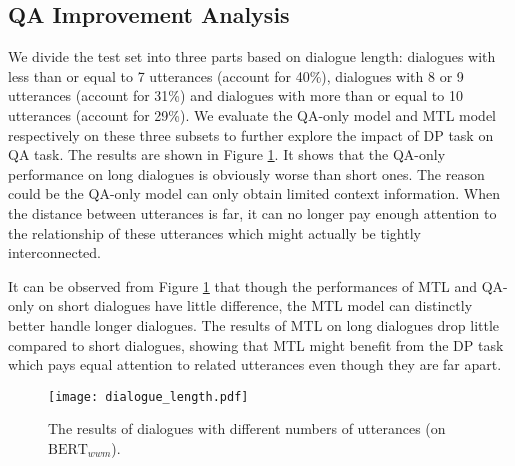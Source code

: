 \documentclass[11pt]{article}
\begin{document}
\subsection{QA Improvement Analysis}\label{subsec:QA improvement analysis}
We divide the test set into three parts based on dialogue length: dialogues with less than or equal to 7 utterances (account for 40\%), dialogues with 8 or 9 utterances (account for 31\%) and dialogues with more than or equal to 10 utterances (account for 29\%). We evaluate the QA-only model and MTL model respectively on these three subsets to further explore the impact of DP task on QA task. The results are shown in Figure \ref{fig:dialogue length}. It shows that the QA-only performance on long dialogues is obviously worse than short ones. The reason could be the QA-only model can only obtain limited context information. When the distance between utterances is far, it can no longer pay enough attention to the relationship of these utterances which might actually be tightly interconnected.

It can be observed from Figure \ref{fig:dialogue length} that though the performances of MTL and QA-only on short dialogues have little difference, the MTL model can distinctly better handle longer dialogues. The results of MTL on long dialogues drop little compared to short dialogues, showing that MTL might benefit from the DP task which pays equal attention to related utterances even though they are far apart.
\begin{figure}[ht]
		\centering
		\texttt{[image: dialogue\_length.pdf]}
		\caption{\label{fig:dialogue length}The results of dialogues with different numbers of utterances (on $\textrm{BERT}_{wwm}$).}
\end{figure}
\end{document}
